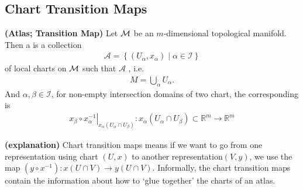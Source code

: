 \documentclass[12pt]{article} %
\newcommand{\bfs}[1]{\textbf{({#1}) }}
\begin{document}
\subsection{Chart Transition Maps}
\begin{defa}\bfs{Atlas; Transition Map}
Let $\mathcal{M}$ be an $m$-dimensional topological manifold. Then a  is a collection
\begin{align*}
\mathcal{A}=\left\{\left(U_{\alpha}, x_{\alpha}\right) \mid \alpha \in \mathcal{I}\right\}
\end{align*}
of local charts on $\mathcal{M}$ such that $\mathcal{A}$ , i.e.
\begin{align*}
M=\bigcup_{\alpha} U_{\alpha}.
\end{align*}
And  $\alpha, \beta \in \mathcal{I}$, for non-empty intersection domains of two chart, the corresponding  is %
\begin{align*}
\left.x_{\beta} \circ x_{\alpha}^{-1}\right|_{x_{\alpha}\left(U_{\alpha} \cap U_{\beta}\right)}: x_{\alpha}\left(U_{\alpha} \cap U_{\beta}\right) \subset \mathbb{R}^{m} \rightarrow \mathbb{R}^{m} 
\end{align*}
\end{defa}
\begin{rema}\bfs{explanation}
Chart transition maps means if we want to go from  one representation using chart $(U, x)$ to another representation$(V, y)$, we use the map $(y\circ x^{-1}): x(U\cap V) \to y(U\cap V)$.
Informally, the chart transition maps contain the information about how to `glue together' the charts of an atlas.
\end{rema}
\end{document}
